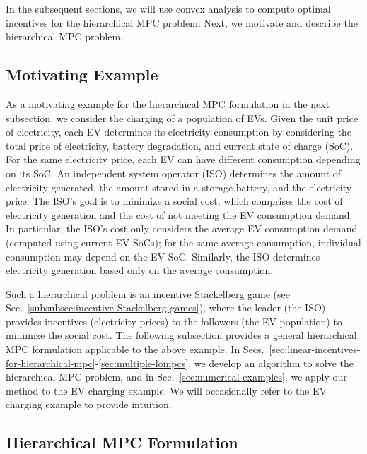 In the subsequent sections, we will use convex analysis to compute optimal incentives for the hierarchical MPC problem.
Next, we motivate and describe the hierarchical MPC problem.

\subsection{Motivating Example}
\label{subsec:motivating-example}

As a motivating example for the hierarchical MPC formulation in the next subsection, we consider the charging of a population of EVs.
Given the unit price of electricity, each EV determines its electricity consumption by considering the total price of electricity, battery degradation, and current state of charge (SoC).
For the same electricity price, each EV can have different consumption depending on its SoC.
An independent system operator (ISO) determines the amount of electricity generated, the amount stored in a storage battery,
and the electricity price.
The ISO's goal is to minimize a social cost, which comprises the cost of electricity generation and the cost of not meeting the EV consumption demand.
In particular, the ISO's cost only considers the average EV consumption demand (computed using current EV SoCs); for the same average consumption, individual consumption may depend on the EV SoC.
Similarly, the ISO determines electricity generation based only on the average consumption.

Such a hierarchical problem is an incentive Stackelberg game (see Sec.~\ref{subsubsec:incentive-Stackelberg-games}), where the leader (the ISO) provides incentives (electricity prices) to the followers (the EV population) to minimize the social cost.
The following subsection provides a general hierarchical MPC formulation applicable to the above example.
In Secs.~\ref{sec:linear-incentives-for-hierarchical-mpc}-\ref{sec:multiple-lompcs}, we develop an algorithm to solve the hierarchical MPC problem, and in Sec.~\ref{sec:numerical-examples}, we apply our method to the EV charging example.
We will occasionally refer to the EV charging example to provide intuition.


\subsection{Hierarchical MPC Formulation}
\label{subsec:hierarchical-formulation}

